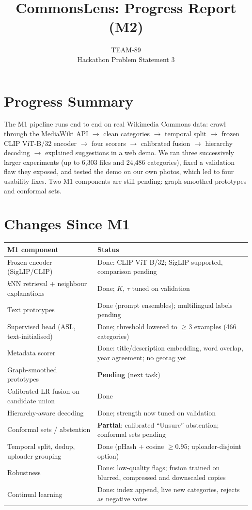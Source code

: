 \documentclass[10pt,twocolumn]{article}
\title{\vspace{-1.4cm}\textbf{CommonsLens: Progress Report (M2)}\vspace{-0.25cm}}
\author{TEAM-89\\\small Hackathon Problem Statement 3}
\date{\vspace{-0.9cm}}
\begin{document}
\maketitle

\section{Progress Summary}
The M1 pipeline runs end to end on real Wikimedia Commons data: crawl through the MediaWiki API
$\rightarrow$ clean categories $\rightarrow$ temporal split $\rightarrow$ frozen CLIP ViT-B/32 encoder
$\rightarrow$ four scorers $\rightarrow$ calibrated fusion $\rightarrow$ hierarchy decoding $\rightarrow$
explained suggestions in a web demo. We ran three successively larger experiments (up to 6,303 files and
24,486 categories), fixed a validation flaw they exposed, and tested the demo on our own photos, which led
to four usability fixes. Two M1 components are still pending: graph-smoothed prototypes and conformal sets.

\section{Changes Since M1}
{\small
\begin{tabular}{@{}>{\raggedright\arraybackslash}p{}>{\raggedright\arraybackslash}p{}@{}}
\toprule
\textbf{M1 component} & \textbf{Status} \\ \midrule
Frozen encoder (SigLIP/CLIP) & Done: CLIP ViT-B/32; SigLIP supported, comparison pending \\
$k$NN retrieval + neighbour explanations & Done; $K$, $\tau$ tuned on validation \\
Text prototypes & Done (prompt ensembles); multilingual labels pending \\
Supervised head (ASL, text-initialised) & Done; threshold lowered to $\geq$3 examples (466 categories) \\
Metadata scorer & Done: title/description embedding, word overlap, year agreement; no geotag yet \\
Graph-smoothed prototypes & \textbf{Pending} (next task) \\
Calibrated LR fusion on candidate union & Done \\
Hierarchy-aware decoding & Done; strength now tuned on validation \\
Conformal sets / abstention & \textbf{Partial}: calibrated ``Unsure'' abstention; conformal sets pending \\
Temporal split, dedup, uploader grouping & Done (pHash + cosine $\geq$0.95; uploader-disjoint option) \\
Robustness & Done: low-quality flags; fusion trained on blurred, compressed and downscaled copies \\
Continual learning & Done: index append, live new categories, rejects as negative votes \\
\bottomrule
\end{tabular}}
\end{document}
